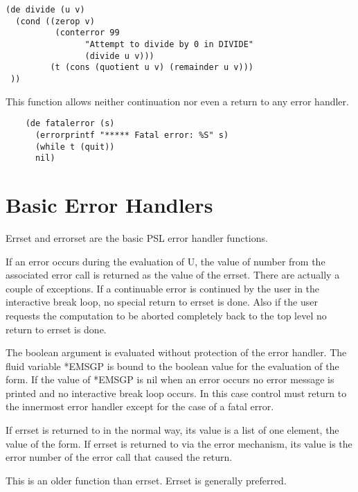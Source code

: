 \begin{verbatim}
(de divide (u v)
  (cond ((zerop v)
          (conterror 99
                "Attempt to divide by 0 in DIVIDE"
                (divide u v)))
         (t (cons (quotient u v) (remainder u v)))
 ))
\end{verbatim}

{This  function allows neither continuation nor even a return
    to any error handler.
}
\begin{verbatim}
    (de fatalerror (s)
      (errorprintf "***** Fatal error: %S" s)
      (while t (quit))
      nil)
\end{verbatim}

\section{Basic Error Handlers}

{    Errset  and  errorset  are  the  basic  PSL  error   handler
    functions.
}

    If  an error occurs during the evaluation of U, the value of
    number from the associated error call  is  returned  as  the
    value  of  the  errset.    There  are  actually  a couple of
    exceptions.  If a continuable error is continued by the user
    in the interactive break loop, no special return  to  errset
    is  done.    Also if the user requests the computation to be
    aborted completely back to the top level no return to errset
    is done.

    The boolean argument is evaluated without protection of  the
    error  handler.    The fluid variable *EMSGP is bound to the
    boolean value for the evaluation of the form.  If the  value
    of  *EMSGP  is  nil when an error occurs no error message is
    printed and no interactive break loop occurs.  In this  case
    control  must  return  to the innermost error handler except
    for the case of a fatal error.

    If errset is returned to in the normal way, its value  is  a
    list  of  one  element, the value of the form.  If errset is
    returned to via the error mechanism, its value is the  error
    number of the error call that caused the return.



{    This  is an older function than errset.  Errset is generally
    preferred.  }

